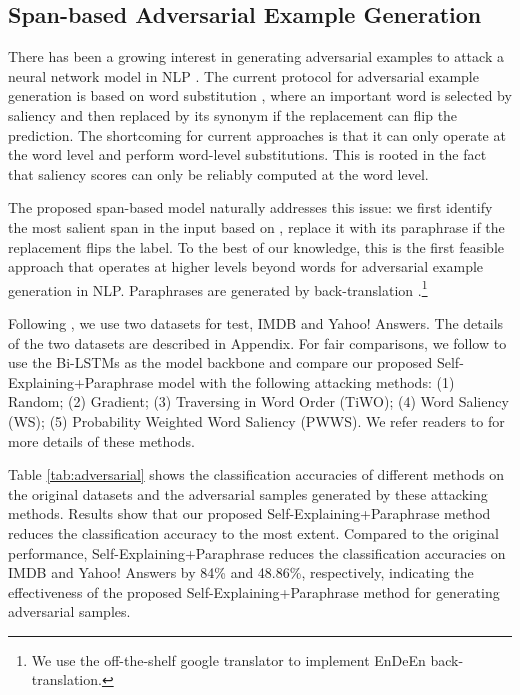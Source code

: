 \documentclass[11pt,a4paper]{article}
\begin{document}
\subsection{Span-based Adversarial Example Generation}
There has been a growing interest in generating adversarial examples to attack a neural network model in NLP \citep{alzantot2018generating,ren-etal-2019-generating,zhang2020adversarial}. 
The current  protocol for adversarial example generation is based on word substitution \citep{liang2017deep,ebrahimi2017hotflip,samanta2017towards,ren-etal-2019-generating}, where an important word is  selected by saliency  and then 
replaced by its synonym if the replacement can flip the prediction. 
The shortcoming for current approaches is that it can only operate at the word level and perform word-level substitutions. This is rooted in the fact that 
 saliency scores can only be reliably computed at the word level.

The proposed span-based model naturally addresses this issue: 
we  first  identify the most salient span in the input based on , replace it with its paraphrase if the replacement flips the label.
To the best of our knowledge, this is the first feasible approach that operates at higher levels beyond words for adversarial example generation in NLP. 
Paraphrases are generated by 
back-translation \citep{sennrich2016back-translation,edunov2018understanding}.\footnote{We use the 
off-the-shelf google translator to implement EnDeEn back-translation.} 

Following \citet{ren-etal-2019-generating}, 
we use two datasets for test, IMDB \citep{maas2011learning} and Yahoo! Answers.
The details of the two datasets are described in Appendix. 
For fair comparisons, we follow \citet{ren-etal-2019-generating} to use the Bi-LSTMs as the model backbone and compare our proposed Self-Explaining+Paraphrase model with the following attacking methods: (1) Random; (2) {Gradient}; (3) {Traversing in Word Order (TiWO)}; (4) {Word Saliency (WS)}; (5) Probability Weighted Word Saliency (PWWS). We refer readers to  \citet{ren-etal-2019-generating} for more details of these methods.

Table \ref{tab:adversarial} shows the classification accuracies of different methods on the original datasets and the adversarial samples generated by these attacking methods. 
Results show that our proposed Self-Explaining+Paraphrase method reduces the classification accuracy to the most extent. Compared to the original performance, Self-Explaining+Paraphrase reduces the classification accuracies on IMDB and Yahoo! Answers by 84\% and 48.86\%, respectively, indicating the effectiveness of the proposed Self-Explaining+Paraphrase method for generating adversarial samples.
\end{document}
